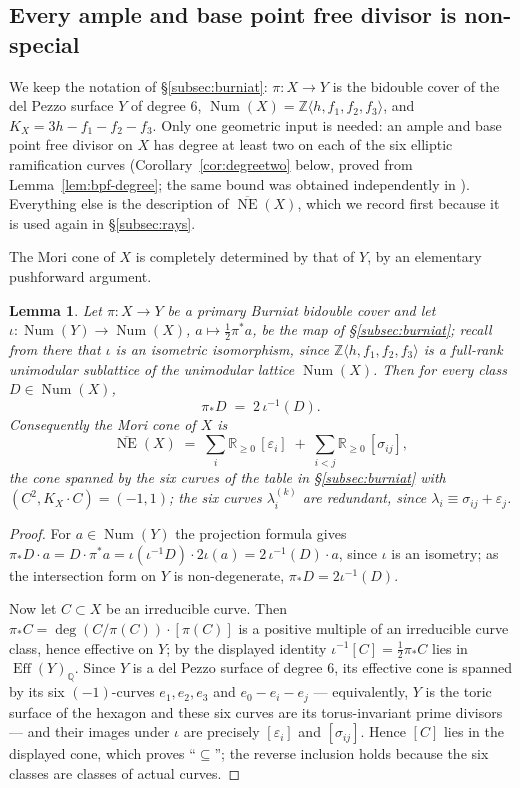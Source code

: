 \documentclass[10pt,a4paper]{amsart}
\newtheorem{lemma}[theorem]{Lemma}
\newcommand{\ZZ}{\mathbb{Z}}
\newcommand{\Num}{\operatorname{Num}}
\newcommand{\QQ}{\mathbb{Q}}
\newcommand{\RR}{\mathbb{R}}
\newcommand{\NE}{\overline{\operatorname{NE}}}
\newcommand{\Eff}{\operatorname{Eff}}
\begin{document}
\subsection{Every ample and base point free divisor is non-special}\label{subsec:nonspecial}
We keep the notation of \S\ref{subsec:burniat}: $\pi:X\to Y$ is the bidouble cover of the del Pezzo surface $Y$ of degree $6$, $\Num(X)=\ZZ\langle h,f_1,f_2,f_3\rangle$, and $K_X=3h-f_1-f_2-f_3$. Only one geometric input is needed: an ample and base point free divisor on $X$ has degree at least two on each of the six elliptic ramification curves (Corollary~\ref{cor:degreetwo} below, proved from Lemma~\ref{lem:bpf-degree}; the same bound was obtained independently in \cite[Prop.~5.4]{Cho26}). Everything else is the description of $\NE(X)$, which we record first because it is used again in \S\ref{subsec:rays}.

The Mori cone of $X$ is completely determined by that of $Y$, by an elementary pushforward argument.

\begin{lemma}\label{lem:mori}
Let $\pi:X\to Y$ be a primary Burniat bidouble cover and let $\iota:\Num(Y)\to\Num(X)$, $a\mapsto\tfrac12\pi^*a$, be the map of \S\ref{subsec:burniat}; recall from there that $\iota$ is an isometric \emph{isomorphism}, since $\ZZ\langle h,f_1,f_2,f_3\rangle$ is a full-rank unimodular sublattice of the unimodular lattice $\Num(X)$. Then for every class $D\in\Num(X)$,
\[
\pi_*D\;=\;2\,\iota^{-1}(D).
\]
Consequently the Mori cone of $X$ is
\[
\NE(X)\;=\;\sum_{i}\RR_{\ge0}\,[\varepsilon_i]\;+\;\sum_{i<j}\RR_{\ge0}\,[\sigma_{ij}] ,
\]
the cone spanned by the six curves of the table in \S\ref{subsec:burniat} with $(C^2,K_X\cdot C)=(-1,1)$; the six curves $\lambda_i^{(k)}$ are redundant, since $\lambda_i\equiv\sigma_{ij}+\varepsilon_j$.
\end{lemma}

\begin{proof}
For $a\in\Num(Y)$ the projection formula gives $\pi_*D\cdot a=D\cdot\pi^*a=\iota(\iota^{-1}D)\cdot 2\iota(a)=2\,\iota^{-1}(D)\cdot a$, since $\iota$ is an isometry; as the intersection form on $Y$ is non-degenerate, $\pi_*D=2\iota^{-1}(D)$.

Now let $C\subset X$ be an irreducible curve. Then $\pi_*C=\deg(C/\pi(C))\cdot[\pi(C)]$ is a positive multiple of an irreducible curve class, hence effective on $Y$; by the displayed identity $\iota^{-1}[C]=\tfrac12\pi_*C$ lies in $\Eff(Y)_\QQ$. Since $Y$ is a del Pezzo surface of degree $6$, its effective cone is spanned by its six $(-1)$-curves $e_1,e_2,e_3$ and $e_0-e_i-e_j$ --- equivalently, $Y$ is the toric surface of the hexagon and these six curves are its torus-invariant prime divisors --- and their images under $\iota$ are precisely $[\varepsilon_i]$ and $[\sigma_{ij}]$. Hence $[C]$ lies in the displayed cone, which proves ``$\subseteq$''; the reverse inclusion holds because the six classes are classes of actual curves.
\end{proof}
\end{document}
